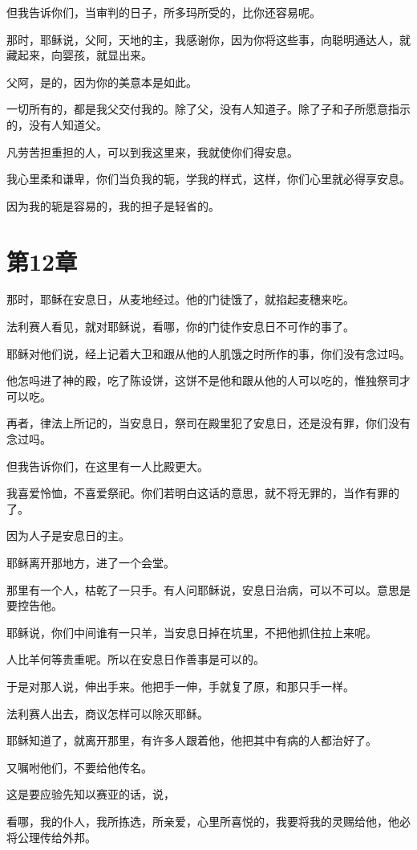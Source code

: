 \documentclass[12pt,oneside]{book}
\begin{document}
但我告诉你们，当审判的日子，所多玛所受的，比你还容易呢。

那时，耶稣说，父阿，天地的主，我感谢你，因为你将这些事，向聪明通达人，就藏起来，向婴孩，就显出来。

父阿，是的，因为你的美意本是如此。

一切所有的，都是我父交付我的。除了父，没有人知道子。除了子和子所愿意指示的，没有人知道父。

凡劳苦担重担的人，可以到我这里来，我就使你们得安息。

我心里柔和谦卑，你们当负我的轭，学我的样式，这样，你们心里就必得享安息。

因为我的轭是容易的，我的担子是轻省的。

\chapter{第12章}
那时，耶稣在安息日，从麦地经过。他的门徒饿了，就掐起麦穗来吃。

法利赛人看见，就对耶稣说，看哪，你的门徒作安息日不可作的事了。

耶稣对他们说，经上记着大卫和跟从他的人肌饿之时所作的事，你们没有念过吗。

他怎吗进了神的殿，吃了陈设饼，这饼不是他和跟从他的人可以吃的，惟独祭司才可以吃。

再者，律法上所记的，当安息日，祭司在殿里犯了安息日，还是没有罪，你们没有念过吗。

但我告诉你们，在这里有一人比殿更大。

我喜爱怜恤，不喜爱祭祀。你们若明白这话的意思，就不将无罪的，当作有罪的了。

因为人子是安息日的主。

耶稣离开那地方，进了一个会堂。

那里有一个人，枯乾了一只手。有人问耶稣说，安息日治病，可以不可以。意思是要控告他。

耶稣说，你们中间谁有一只羊，当安息日掉在坑里，不把他抓住拉上来呢。

人比羊何等贵重呢。所以在安息日作善事是可以的。

于是对那人说，伸出手来。他把手一伸，手就复了原，和那只手一样。

法利赛人出去，商议怎样可以除灭耶稣。

耶稣知道了，就离开那里，有许多人跟着他，他把其中有病的人都治好了。

又嘱咐他们，不要给他传名。

这是要应验先知以赛亚的话，说，

看哪，我的仆人，我所拣选，所亲爱，心里所喜悦的，我要将我的灵赐给他，他必将公理传给外邦。
\end{document}
